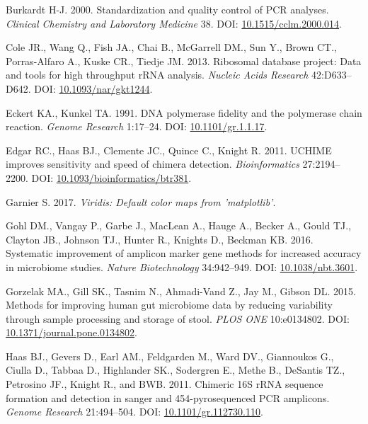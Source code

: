 \documentclass[12pt,]{article}
\begin{document}
\hypertarget{ref-Burkardt2000}{}
Burkardt H-J. 2000. Standardization and quality control of PCR analyses.
\emph{Clinical Chemistry and Laboratory Medicine} 38. DOI:
\href{https://doi.org/10.1515/cclm.2000.014}{10.1515/cclm.2000.014}.

\hypertarget{ref-rdp_Cole_2013}{}
Cole JR., Wang Q., Fish JA., Chai B., McGarrell DM., Sun Y., Brown CT.,
Porras-Alfaro A., Kuske CR., Tiedje JM. 2013. Ribosomal database
project: Data and tools for high throughput rRNA analysis. \emph{Nucleic
Acids Research} 42:D633--D642. DOI:
\href{https://doi.org/10.1093/nar/gkt1244}{10.1093/nar/gkt1244}.

\hypertarget{ref-Eckert1991}{}
Eckert KA., Kunkel TA. 1991. DNA polymerase fidelity and the polymerase
chain reaction. \emph{Genome Research} 1:17--24. DOI:
\href{https://doi.org/10.1101/gr.1.1.17}{10.1101/gr.1.1.17}.

\hypertarget{ref-uchime_Edgar_2011}{}
Edgar RC., Haas BJ., Clemente JC., Quince C., Knight R. 2011. UCHIME
improves sensitivity and speed of chimera detection.
\emph{Bioinformatics} 27:2194--2200. DOI:
\href{https://doi.org/10.1093/bioinformatics/btr381}{10.1093/bioinformatics/btr381}.

\hypertarget{ref-viridis_citation_2017}{}
Garnier S. 2017. \emph{Viridis: Default color maps from 'matplotlib'}.

\hypertarget{ref-taq_Gohl_2016}{}
Gohl DM., Vangay P., Garbe J., MacLean A., Hauge A., Becker A., Gould
TJ., Clayton JB., Johnson TJ., Hunter R., Knights D., Beckman KB. 2016.
Systematic improvement of amplicon marker gene methods for increased
accuracy in microbiome studies. \emph{Nature Biotechnology} 34:942--949.
DOI: \href{https://doi.org/10.1038/nbt.3601}{10.1038/nbt.3601}.

\hypertarget{ref-Gorzelak2015}{}
Gorzelak MA., Gill SK., Tasnim N., Ahmadi-Vand Z., Jay M., Gibson DL.
2015. Methods for improving human gut microbiome data by reducing
variability through sample processing and storage of stool. \emph{PLOS
ONE} 10:e0134802. DOI:
\href{https://doi.org/10.1371/journal.pone.0134802}{10.1371/journal.pone.0134802}.

\hypertarget{ref-Haas2011}{}
Haas BJ., Gevers D., Earl AM., Feldgarden M., Ward DV., Giannoukos G.,
Ciulla D., Tabbaa D., Highlander SK., Sodergren E., Methe B., DeSantis
TZ., Petrosino JF., Knight R., and BWB. 2011. Chimeric 16S rRNA sequence
formation and detection in sanger and 454-pyrosequenced PCR amplicons.
\emph{Genome Research} 21:494--504. DOI:
\href{https://doi.org/10.1101/gr.112730.110}{10.1101/gr.112730.110}.
\end{document}
